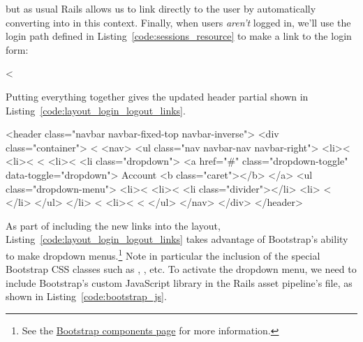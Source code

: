 \noindent but as usual Rails allows us to link directly to the user by automatically converting  into  in this context. Finally, when users \emph{aren't} logged in, we'll use the login path defined in Listing~\ref{code:sessions_resource} to make a link to the login form:

\begin{code}
<%
\end{code}

\noindent Putting everything together gives the updated header partial shown in Listing~\ref{code:layout_login_logout_links}.

\begin{codelisting}
\label{code:layout_login_logout_links}
\begin{code}
<header class="navbar navbar-fixed-top navbar-inverse">
  <div class="container">
    <%
    <nav>
      <ul class="nav navbar-nav navbar-right">
        <li><%
        <li><%
        <%
          <li><%
          <li class="dropdown">
            <a href="#" class="dropdown-toggle" data-toggle="dropdown">
              Account <b class="caret"></b>
            </a>
            <ul class="dropdown-menu">
              <li><%
              <li><%
              <li class="divider"></li>
              <li>
                <%
              </li>
            </ul>
          </li>
        <%
          <li><%
        <%
      </ul>
    </nav>
  </div>
</header>
\end{code}
\end{codelisting}


As part of including the new links into the layout, Listing~\ref{code:layout_login_logout_links} takes advantage of Bootstrap's ability to make dropdown menus.\footnote{See the \href{http://getbootstrap.com/components/}{Bootstrap components page} for more information.} Note in particular the inclusion of the special Bootstrap CSS classes such as , , etc. To activate the dropdown menu, we need to include Bootstrap's custom JavaScript library in the Rails asset pipeline's  file, as shown in Listing~\ref{code:bootstrap_js}.

